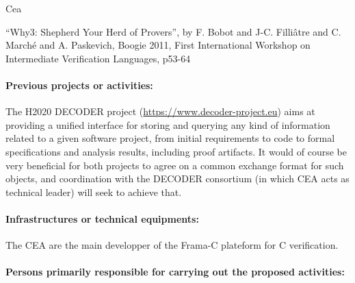 \begin{sitedescription}{Cea}

\begin{compactitem}
\item ``Why3: Shepherd Your Herd of Provers'', by F. Bobot and J-C. Filli\^atre and
C. March\'e and A. Paskevich, Boogie 2011, First International Workshop on
Intermediate Verification Languages, p53-64
\end{compactitem}


\paragraph{Previous projects or activities:}


\begin{compactitem}
\item The H2020 DECODER project (\url{https://www.decoder-project.eu}) aims at
providing a unified interface for storing and querying any kind of
information related to a given software project, from initial
requirements to code to formal specifications and analysis results,
including proof artifacts. It would of course be very beneficial for
both projects to agree on a common exchange format for such objects, and
coordination with the DECODER consortium (in which CEA acts as technical
leader) will seek to achieve that.
\end{compactitem}


\paragraph{Infrastructures or technical equipments:}


The CEA are the main developper of the Frama-C plateform for C verification.

\paragraph{Persons primarily responsible for carrying out the proposed activities:}

\begin{itemize} %



\end{itemize}
\end{sitedescription}
